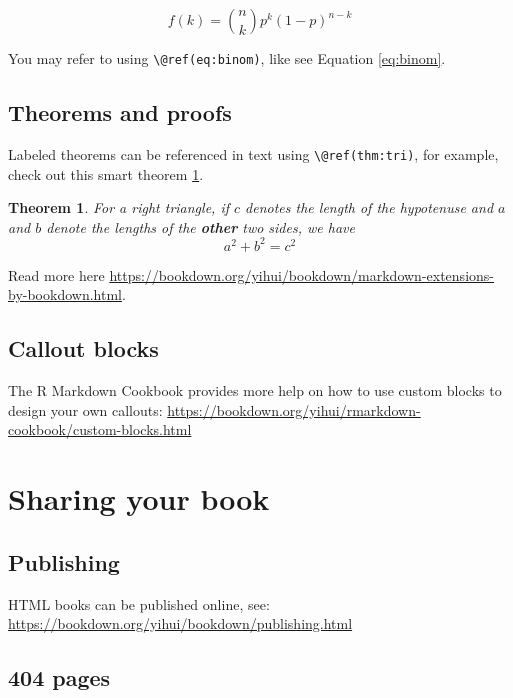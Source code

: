 \documentclass[
]{book}
\newtheorem{theorem}{Theorem}[chapter]
\theoremstyle{definition}
\theoremstyle{definition}
\theoremstyle{definition}
\theoremstyle{definition}
\theoremstyle{remark}
\begin{document}
\begin{equation} 
  f\left(k\right) = \binom{n}{k} p^k\left(1-p\right)^{n-k}
  \label{eq:binom}
\end{equation}

You may refer to using \texttt{\textbackslash{}@ref(eq:binom)}, like see Equation \eqref{eq:binom}.

\hypertarget{theorems-and-proofs}{%
\section{Theorems and proofs}\label{theorems-and-proofs}}

Labeled theorems can be referenced in text using \texttt{\textbackslash{}@ref(thm:tri)}, for example, check out this smart theorem \ref{thm:tri}.

\begin{theorem}
\protect\hypertarget{thm:tri}{}\label{thm:tri}For a right triangle, if \(c\) denotes the \emph{length} of the hypotenuse
and \(a\) and \(b\) denote the lengths of the \textbf{other} two sides, we have
\[a^2 + b^2 = c^2\]
\end{theorem}

Read more here \url{https://bookdown.org/yihui/bookdown/markdown-extensions-by-bookdown.html}.

\hypertarget{callout-blocks}{%
\section{Callout blocks}\label{callout-blocks}}

The R Markdown Cookbook provides more help on how to use custom blocks to design your own callouts: \url{https://bookdown.org/yihui/rmarkdown-cookbook/custom-blocks.html}

\hypertarget{sharing-your-book}{%
\chapter{Sharing your book}\label{sharing-your-book}}

\hypertarget{publishing}{%
\section{Publishing}\label{publishing}}

HTML books can be published online, see: \url{https://bookdown.org/yihui/bookdown/publishing.html}

\hypertarget{pages}{%
\section{404 pages}\label{pages}}
\end{document}
